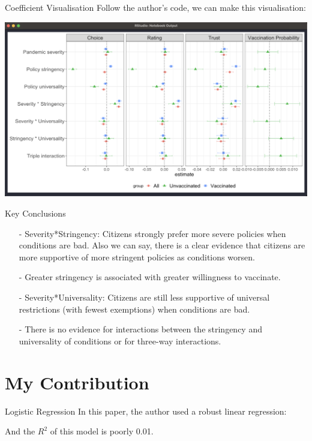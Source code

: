 \documentclass{beamer}
\begin{document}
\begin{frame}{Coefficient Visualisation}
\noindent Follow the author's code, we can make this visualisation:
\par
\includegraphics[width=1.05\textwidth]{reg_results.png}
\end{frame}

\begin{frame}{Key Conclusions}
	\begin{itemize}
		\item[-] Severity*Stringency: Citizens strongly prefer more severe policies when conditions are bad. Also we can say, there is a clear evidence that citizens are more supportive of more stringent policies as conditions worsen.
		\item[-] Greater stringency is associated with greater willingness to vaccinate.
		\item[-] Severity*Universality: Citizens are still less supportive of universal restrictions (with fewest exemptions) when conditions are bad.
		\item[-] There is no evidence for interactions between the stringency and universality of conditions or for three-way interactions. 
	\end{itemize}
	\end{frame}

\section{My Contribution}

\begin{frame}{Logistic Regression}
\noindent In this paper, the author used a robust linear regression:

And the $R^2$ of this model is poorly 0.01.
\end{frame}
\end{document}
